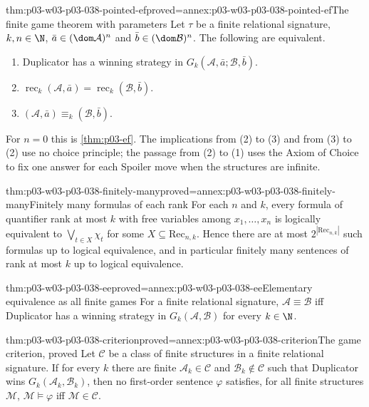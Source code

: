 \begin{hbtheorem}{thm:p03-w03-p03-038-pointed-ef}{proved=annex:p03-w03-p03-038-pointed-ef}{The finite game theorem with parameters}
Let \(\tau\) be a finite relational signature, \(k,n\in\N\),
\(\bar a\in(\dom\mathcal A)^n\) and \(\bar b\in(\dom\mathcal B)^n\). The
following are equivalent.
\begin{enumerate}
\item Duplicator has a winning strategy in
      \(G_k(\mathcal A,\bar a;\mathcal B,\bar b)\).
\item \(\operatorname{rec}_k(\mathcal A,\bar a)=
       \operatorname{rec}_k(\mathcal B,\bar b)\).
\item \((\mathcal A,\bar a)\equiv_k(\mathcal B,\bar b)\).
\end{enumerate}
For \(n=0\) this is \cref{thm:p03-ef}. The implications from (2) to (3)
and from (3) to (2) use no choice principle; the passage from (2) to (1)
uses the Axiom of Choice to fix one answer for each Spoiler move when the
structures are infinite.
\end{hbtheorem}

\begin{hbcorollary}{thm:p03-w03-p03-038-finitely-many}{proved=annex:p03-w03-p03-038-finitely-many}{Finitely many formulas of each rank}
For each \(n\) and \(k\), every formula of quantifier rank at most \(k\)
with free variables among \(x_1,\ldots,x_n\) is logically equivalent to
\(\bigvee_{t\in X}\chi_t\) for some \(X\subseteq\mathrm{Rec}_{n,k}\).
Hence there are at most \(2^{|\mathrm{Rec}_{n,k}|}\) such formulas up to
logical equivalence, and in particular finitely many sentences of rank at
most \(k\) up to logical equivalence.
\end{hbcorollary}

\begin{hbcorollary}{thm:p03-w03-p03-038-ee}{proved=annex:p03-w03-p03-038-ee}{Elementary equivalence as all finite games}
For a finite relational signature, \(\mathcal A\equiv\mathcal B\) iff
Duplicator has a winning strategy in \(G_k(\mathcal A,\mathcal B)\) for
every \(k\in\N\).
\end{hbcorollary}

\begin{hbcorollary}{thm:p03-w03-p03-038-criterion}{proved=annex:p03-w03-p03-038-criterion}{The game criterion, proved}
Let \(\mathcal C\) be a class of finite structures in a finite relational
signature. If for every \(k\) there are finite
\(\mathcal A_k\in\mathcal C\) and \(\mathcal B_k\notin\mathcal C\) such that
Duplicator wins \(G_k(\mathcal A_k,\mathcal B_k)\), then no first-order
sentence \(\varphi\) satisfies, for all finite structures \(\mathcal M\),
\(\mathcal M\models\varphi\) iff \(\mathcal M\in\mathcal C\).
\end{hbcorollary}

